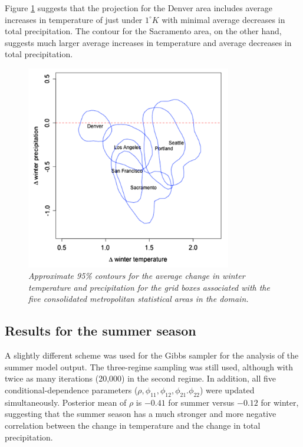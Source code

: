 \documentclass[12pt]{amsart}
\begin{document}
Figure \ref{fig: Fig9} suggests that the projection for the Denver area includes average increases in temperature of just under $1^\circ K$ with minimal average decreases in total precipitation. The contour for the Sacramento area, on the other hand, suggests much larger average increases in temperature and average decreases in total precipitation.

\begin{figure}[H]
    \centering
    \includegraphics[width = 0.8\textwidth]{Fig9.png}
    \caption{\emph{Approximate 95\% contours for the average change in winter temperature and precipitation for the grid boxes associated with the five consolidated metropolitan statistical areas in the domain.}}
    \label{fig: Fig9}
\end{figure}

\subsection{Results for the summer season}

A slightly different scheme was used for the Gibbs sampler for the analysis of the summer model output. The three-regime sampling was still used, although with twice as many iterations (20,000) in the second regime. In addition, all five conditional-dependence parameters ($\rho, \phi_{11}, \phi_{12}, \phi_{21}. \phi_{22}$) were updated simultaneously. Posterior mean of $\rho$ is $-0.41$ for summer versus $-0.12$ for winter, suggesting that the summer season has a much stronger and more negative correlation between the change in temperature and the change in total precipitation.
\end{document}
